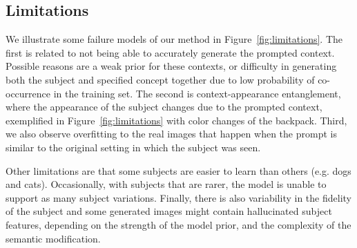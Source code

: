 \subsection{Limitations}
We illustrate some failure models of our method in Figure~\ref{fig:limitations}. The first is related to not being able to accurately generate the prompted context. Possible reasons are a weak prior for these contexts, or difficulty in generating both the subject and specified concept together due to low probability of co-occurrence in the training set. The second is context-appearance entanglement, where the appearance of the subject changes due to the prompted context, exemplified in Figure~\ref{fig:limitations} with color changes of the backpack. Third, we also observe overfitting to the real images that happen when the prompt is similar to the original setting in which the subject was seen.

Other limitations are that some subjects are easier to learn than others (e.g. dogs and cats). Occasionally, with subjects that are rarer, the model is unable to support as many subject variations. Finally, there is also variability in the fidelity of the subject and some generated images might contain hallucinated subject features, depending on the strength of the model prior, and the complexity of the semantic modification.